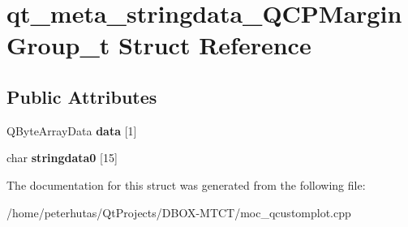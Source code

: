\hypertarget{structqt__meta__stringdata___q_c_p_margin_group__t}{}\section{qt\+\_\+meta\+\_\+stringdata\+\_\+\+Q\+C\+P\+Margin\+Group\+\_\+t Struct Reference}
\label{structqt__meta__stringdata___q_c_p_margin_group__t}
\subsection*{Public Attributes}
\begin{DoxyCompactItemize}
\item 
\mbox{\label{structqt__meta__stringdata___q_c_p_margin_group__t_a99abe4f941bb7fbdfd988480fd5e6dc9}} 
Q\+Byte\+Array\+Data {\bfseries data} \mbox{[}1\mbox{]}
\item 
\mbox{\label{structqt__meta__stringdata___q_c_p_margin_group__t_aea2e8169d7b920f953fc3d240d03082b}} 
char {\bfseries stringdata0} \mbox{[}15\mbox{]}
\end{DoxyCompactItemize}


The documentation for this struct was generated from the following file\+:\begin{DoxyCompactItemize}
\item 
/home/peterhutas/\+Qt\+Projects/\+D\+B\+O\+X-\/\+M\+T\+C\+T/moc\+\_\+qcustomplot.\+cpp\end{DoxyCompactItemize}

